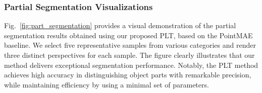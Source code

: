 

\subsubsection{Partial Segmentation Visualizations}  
Fig.~\ref{fig:part_segmentation} provides a visual demonstration of the partial segmentation results obtained using our proposed PLT, based on the PointMAE baseline. We select five representative samples from various categories and render three distinct perspectives for each sample. The figure clearly illustrates that our method delivers exceptional segmentation performance. Notably, the PLT method achieves high accuracy in distinguishing object parts with remarkable precision, while maintaining efficiency by using a minimal set of parameters.

